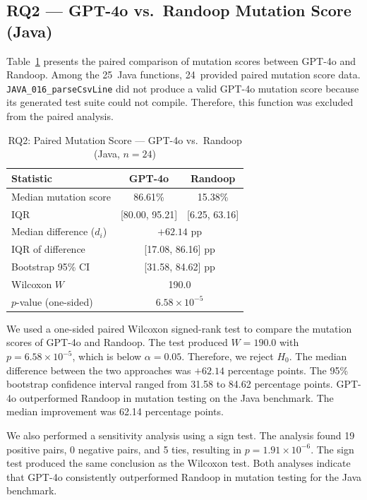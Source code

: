 \documentclass[conference]{IEEEtran}
\begin{document}
\subsection{RQ2 --- GPT-4o vs.\ Randoop Mutation Score (Java)}
\label{subsec:rq2}

Table~\ref{tab:rq2} presents the paired comparison of mutation scores between GPT-4o and Randoop.
Among the 25~Java functions, 24~provided paired mutation score data. \texttt{JAVA\_016\_parseCsvLine} did not produce a valid GPT-4o mutation score because its generated test suite could not compile. Therefore, this function was excluded from the paired analysis.

\begin{table}[ht]
\centering
\caption{RQ2: Paired Mutation Score --- GPT-4o vs.\ Randoop (Java, $n = 24$)}
\label{tab:rq2}
\begin{tabular}{lcc}
\toprule
Statistic & GPT-4o & Randoop \\
\midrule
Median mutation score     & 86.61\%        & 15.38\%       \\
IQR                       & [80.00, 95.21] & [6.25, 63.16] \\
Median difference ($d_i$) & \multicolumn{2}{c}{$+62.14$ pp} \\
IQR of difference         & \multicolumn{2}{c}{[17.08, 86.16] pp} \\
Bootstrap 95\% CI         & \multicolumn{2}{c}{[31.58, 84.62] pp} \\
Wilcoxon $W$              & \multicolumn{2}{c}{190.0} \\
$p$-value (one-sided)     & \multicolumn{2}{c}{$6.58 \times 10^{-5}$} \\
\bottomrule
\end{tabular}
\end{table}

We used a one-sided paired Wilcoxon signed-rank test to compare the mutation scores of GPT-4o and Randoop. The test produced $W = 190.0$ with $p = 6.58 \times 10^{-5}$, which is below $\alpha = 0.05$. Therefore, we reject $H_0$.
The median difference between the two approaches was $+62.14$ percentage points. The 95\% bootstrap confidence interval ranged from 31.58 to 84.62 percentage points. GPT-4o outperformed Randoop in mutation testing on the Java benchmark. The median improvement was 62.14 percentage points.

We also performed a sensitivity analysis using a sign test. The analysis found 19 positive pairs, 0 negative pairs, and 5 ties, resulting in $p = 1.91 \times 10^{-6}$.
The sign test produced the same conclusion as the Wilcoxon test. Both analyses indicate that GPT-4o consistently outperformed Randoop in mutation testing for the Java benchmark.
\end{document}

